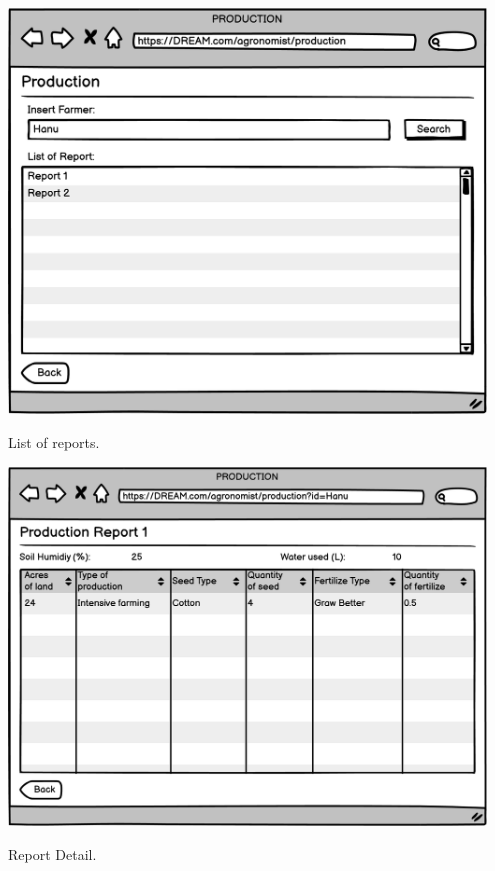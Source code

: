 \begin{minipage}{.5\textwidth}
	\centering
	\includegraphics[width=0.95\textwidth]{Images/Mockup/Agronomist/09AgronomistProduction.png}
	\captionsetup{type=figure}
	\caption{List of reports.}
\end{minipage}%
\begin{minipage}{.5\textwidth}
	\centering
	\includegraphics[width=0.95\textwidth]{Images/Mockup/Agronomist/10AgronomistProductionReport.png}
	\captionsetup{type=figure}
	\caption{Report Detail.}
\end{minipage}
\vspace{0.5cm}
